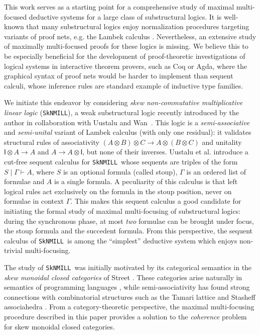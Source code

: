 \documentclass[runningheads]{llncs}
\newcommand{\ot}{\otimes}
\newcommand{\I}{\mathsf{I}}
\newcommand{\SkNMILL}{\texttt{SkNMILL}}
\begin{document}
This work serves as a starting point for a comprehensive study of maximal multi-focused deductive systems for a large class of substructural logics. It is well-known that many substructural logics enjoy normalization procedures targeting variants of proof nets, e.g. the Lambek calculus \cite{LR:pronlc}. Nevertheless, an extensive study of maximally multi-focused proofs for these logics is missing. We believe this to be especially beneficial for the development of proof-theoretic investigations of logical systems in interactive theorem provers, such as Coq or Agda, where  the graphical syntax of proof nets would be harder to implement than sequent calculi, whose inference rules are standard example of inductive type families.

We initiate this endeavor by considering \emph{skew non-commutative multiplicative linear logic} (\SkNMILL), a weak substructural logic recently introduced by the author in collaboration with Uustalu and Wan~\cite{UVW:protsn}. This logic is a \emph{semi-associative} and \emph{semi-unital} variant of Lambek calculus (with only one residual): it validates structural rules of associativity $(A \ot B) \ot C \to A \ot (B \ot C)$ and unitality $\I \ot A \to A$ and $A \to A \ot \I$, but none of their inverses. Uustalu et al. introduce a cut-free sequent calculus for \SkNMILL\ whose sequents are triples of the form $S \mid \Gamma \vdash A$, where $S$ is an optional formula (called stoup), $\Gamma$ is an ordered list of formulae and $A$ is a single formula. A peculiarity of this calculus is that left logical rules act exclusively on the formula in the stoup position, never on formulae in context $\Gamma$. This makes this sequent calculus a good candidate for initiating the formal study of maximal multi-focusing of substructural logics: during the synchronous phase, at most \emph{two} formulae can be brought under focus, the stoup formula and the succedent formula. From this perspective, the sequent calculus of \SkNMILL\ is among the ``simplest'' deductive system which enjoys non-trivial multi-focusing.

The study of \SkNMILL\ was initially motivated by its categorical semantics in the \emph{skew monoidal closed categories} of Street \cite{street:skew-closed:2013}. These categories arise naturally in semantics of programming languages \cite{altenkirch:monads:2014}, while semi-associativity has found strong connections with combinatorial structures such as the Tamari lattice and Stasheff associahedra \cite{zeilberger:semiassociative:19,moortgat:tamari:20}. From a category-theoretic perspective, the maximal multi-focusing procedure described in this paper provides a solution to the \emph{coherence} problem for skew monoidal closed categories.
\end{document}
